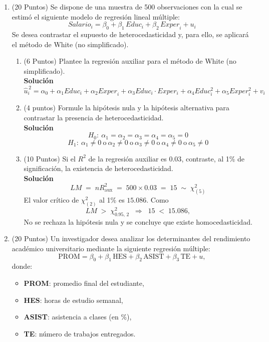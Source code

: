 \documentclass[10pt,a4paper]{article}
\begin{document}
\begin{enumerate}

\item (20 Puntos) Se dispone de una muestra de 500 observaciones con la cual se estimó el siguiente modelo de regresión lineal múltiple:
$$Salario_i = \beta_0 + \beta_1\,\textit{Educ}_i + \beta_2\,\textit{Exper}_i + u_i$$
Se desea contrastar el supuesto de heterocedasticidad y, para ello, se aplicará el método de White (no simplificado).
\begin{enumerate}
    \item (6 Puntos) Plantee la regresión auxiliar para el método de White (no simplificado).\\
    \textbf{Solución}\\
    $$\hat{u}_i^{\,2} = \alpha_0 + \alpha_1 {Educ}_i + \alpha_2 {Exper}_i + \alpha_3 Educ_i\cdot Exper_i + \alpha_4 Educ_i^2+\alpha_5 Exper_i^2+v_i$$
    
    \item (4 puntos) Formule la hipótesis nula y la hipótesis alternativa para contrastar la presencia de heterocedasticidad.\\
    \textbf{Solución}\\
    $$H_0:\ \alpha_1 = \alpha_2 =\alpha_3 =\alpha_4 = \alpha_5=0$$
    $$H_1:\ \alpha_1 \neq 0 \ \text{o}\ \alpha_2 \neq 0 \ \text{o} \ \alpha_3 \neq 0 \ \text{o} \ \alpha_4 \neq 0 \ \text{o} \ \alpha_5 \neq 0$$
    
    \item (10 Puntos) Si el $R^2$ de la regresión auxiliar es $0.03$, contraste, al 1\% de significación, la existencia de heterocedasticidad.\\
    \textbf{Solución}\\
    $$LM \;=\; n R^2_{\text{aux}} \;=\; 500 \times 0.03\;=\; 15 \;\sim\; \chi^2_{(5)}$$
    El valor crítico de $\chi^2_{(2)}$ al 1\% es $15.086$. Como
    $$LM \;>\; \chi^2_{0.95,\,2} \;\; \Longrightarrow \;\; 15 \;<\; 15.086,$$
    No se rechaza la hipótesis nula y se concluye que existe homocedasticidad.
\end{enumerate}

\item (20 Puntos) Un investigador desea analizar los determinantes del rendimiento académico universitario mediante la siguiente regresión múltiple:
\[
\text{PROM} = \beta_0 + \beta_1 \,\text{HES} + \beta_2 \,\text{ASIST} + \beta_3 \,\text{TE} + u,
\]
donde:
\begin{itemize}
  \item \textbf{PROM}: promedio final del estudiante,
  \item \textbf{HES}: horas de estudio semanal,
  \item \textbf{ASIST}: asistencia a clases (en \%),
  \item \textbf{TE}: número de trabajos entregados.
\end{itemize}


\end{enumerate}
\end{document}
